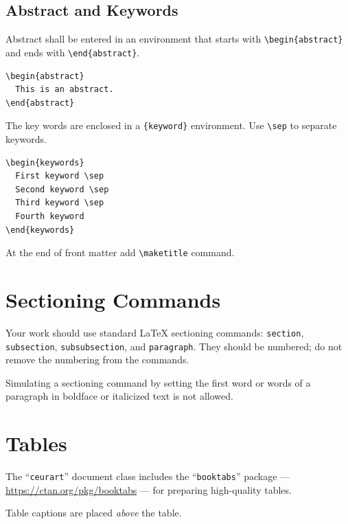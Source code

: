 \documentclass[
]{ceurart}
\begin{document}
\subsection{Abstract and Keywords}

Abstract shall be entered in an environment that starts
with \verb|\begin{abstract}| and ends with
\verb|\end{abstract}|.

\begin{verbatim}
\begin{abstract}
  This is an abstract.
\end{abstract}
\end{verbatim}

The key words are enclosed in a \verb|{keyword}|
environment. Use \verb|\sep| to separate keywords.

\begin{verbatim}
\begin{keywords}
  First keyword \sep
  Second keyword \sep
  Third keyword \sep
  Fourth keyword
\end{keywords}
\end{verbatim}

At the end of front matter add \verb|\maketitle| command.

\section{Sectioning Commands}

Your work should use standard \LaTeX{} sectioning commands:
\verb|section|, \verb|subsection|, \verb|subsubsection|, and
\verb|paragraph|. They should be numbered; do not remove the numbering
from the commands.

Simulating a sectioning command by setting the first word or words of
a paragraph in boldface or italicized text is not allowed.

\section{Tables}

The ``\verb|ceurart|'' document class includes the ``\verb|booktabs|''
package --- \url{https://ctan.org/pkg/booktabs} --- for preparing
high-quality tables.

Table captions are placed \textit{above} the table.
\end{document}
